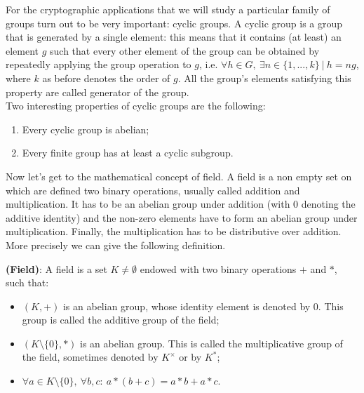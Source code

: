 \bigskip

\noindent
For the cryptographic applications that we will study a particular family of groups turn out to be very important: cyclic groups. A cyclic group is a group that is generated by a single element: this means that it contains (at least) an element $g$ such that every other element of the group can be obtained by repeatedly applying the group operation to $g$, i.e. $\forall h \in G, \ \exists n \in \{1, ..., k\} \ | \ h = ng$, where $k$ as before denotes the order of $g$. All the group's elements satisfying this property are called generator of the group.
\\
Two interesting properties of cyclic groups are the following:
\begin{enumerate}
	\item Every cyclic group is abelian;
	\item Every finite group has at least a cyclic subgroup.
\end{enumerate}

\bigskip
\noindent
Now let's get to the mathematical concept of field. A field is a non empty set on which are defined two binary operations, usually called addition and multiplication. It has to be an abelian group under addition (with 0 denoting the additive identity) and the non-zero elements have to form an abelian group under multiplication. Finally, the multiplication has to be distributive over addition. 
\\
More precisely we can give the following definition.
\begin{mydef} {\bf (Field)}: A field is a set $K \neq \emptyset$ endowed with two binary operations $+$ and $*$, such that:
\begin{itemize}
	\item $(K, +)$ is an abelian group, whose identity element is denoted by 0. This group is called the additive group of the field;
	\item $(K \text{\textbackslash}\{0\}, *)$ is an abelian group. This is called the multiplicative group of the field, sometimes denoted by $K^{\times}$ or by $K^*$;
	\item $\forall a \in K \text{\textbackslash} \{0\}, \ \forall b, c: \ a * (b + c) = a * b + a * c$. 
\end{itemize}
\end{mydef}

